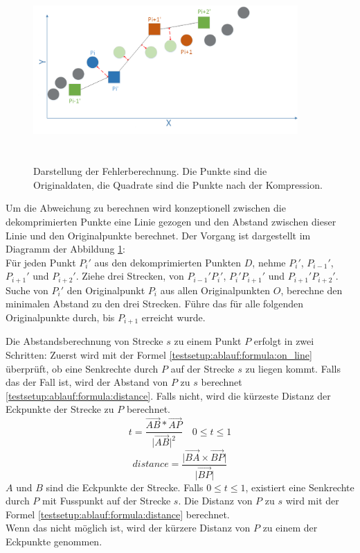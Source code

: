 \begin{figure}[!htbp]
	\center
	\includegraphics[width=0.9\textwidth,height=7cm,keepaspectratio]{./pictures/testsetup/errorcalc.png}
	\caption{Darstellung der Fehlerberechnung. Die Punkte sind die Originaldaten, die Quadrate sind die Punkte nach der Kompression.}
	\label{testsetup:ablauf:fehlerberechnung:diagramm}
\end{figure} 
Um die Abweichung zu berechnen wird konzeptionell zwischen die dekomprimierten Punkte eine Linie gezogen und den Abstand zwischen dieser Linie und den Originalpunkte berechnet. Der Vorgang ist dargestellt im Diagramm der Abbildung \ref{testsetup:ablauf:fehlerberechnung:diagramm}:\\
Für jeden Punkt $P_i'$ aus den dekomprimierten Punkten $D$, nehme $P_i'$, $P_{i-1}'$, $P_{i+1}'$ und $P_{i+2}'$. Ziehe drei Strecken, von $P_{i-1}'P_i'$, $P_{i}'P_{i+1}'$ und $P_{i+1}'P_{i+2}'$. Suche von $P_i'$ den Originalpunkt $P_i$ aus allen Originalpunkten $O$, berechne den minimalen Abstand zu den drei Strecken. Führe das für alle folgenden Originalpunkte durch, bis $P_{i+1}$ erreicht wurde.

Die Abstandsberechnung von Strecke $s$ zu einem Punkt $P$ erfolgt in zwei Schritten: Zuerst wird mit der Formel \eqref{testsetup:ablauf:formula:on_line} überprüft, ob eine Senkrechte durch $P$ auf der Strecke $s$ zu liegen kommt. Falls das der Fall ist, wird der Abstand von $P$ zu $s$ berechnet \eqref{testsetup:ablauf:formula:distance}. Falls nicht, wird die kürzeste Distanz der Eckpunkte der Strecke zu $P$ berechnet.\\
\begin{equation} \label{testsetup:ablauf:formula:on_line}
 t = \frac{\vec{AB}*\vec{AP}}{\lvert \vec{AB}\rvert ^2} \quad 0 \leq t \leq 1
\end{equation}
\begin{equation}\label{testsetup:ablauf:formula:distance}
distance = \frac{\lvert \vec{BA}\times \vec{BP}\rvert}{\lvert \vec{BP} \rvert}
\end{equation}
$A$ und $B$ sind die Eckpunkte der Strecke. Falls $0 \leq t \leq 1$, existiert eine Senkrechte durch $P$ mit Fusspunkt auf der Strecke $s$. Die Distanz von $P$ zu $s$ wird mit der Formel \eqref{testsetup:ablauf:formula:distance} berechnet.\\
Wenn das nicht möglich ist, wird der kürzere Distanz von $P$ zu einem der Eckpunkte genommen. 

